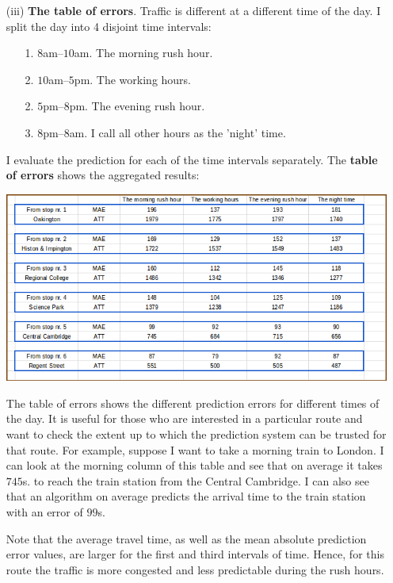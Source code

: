 \documentclass[12pt,a4paper,oneside,openright]{report}
\begin{document}
\begin{enumerate}

\item[(iii)] \textbf{The table of errors}. Traffic is different at a different time of
the day. I split the day into 4 disjoint time intervals:

\begin{enumerate}
\item[1.] $8$am--$10$am. The morning rush hour.
\item[2.] $10$am--$5$pm. The working hours.
\item[2.] $5$pm--$8$pm. The evening rush hour.
\item[3.] $8$pm--$8$am. I call all other hours as the 'night' time.



\end{enumerate}

I evaluate the prediction for each of the time intervals separately. The 
\textbf{table of errors} shows the aggregated results:

\includegraphics[width=\textwidth]{figs/table_of_times.png}

The table of errors shows the different prediction errors for different
times of the day. It is useful for those who are interested in a
particular route and want to check the extent up to which the prediction system 
can be trusted for that route. For example, suppose I want to take a morning train
to London. I can look at the morning column of this table and see that on average
it takes $745$s. to reach the train station from the Central Cambridge. I can
also see that an algorithm on average predicts the arrival time to the train station
with an error of $99$s.

Note that the average travel time, as well as the mean absolute
prediction error values, are larger for the first and third intervals of time.
Hence, for this route the traffic is more congested and less predictable
during the rush hours.

\end{enumerate}
\end{document}
